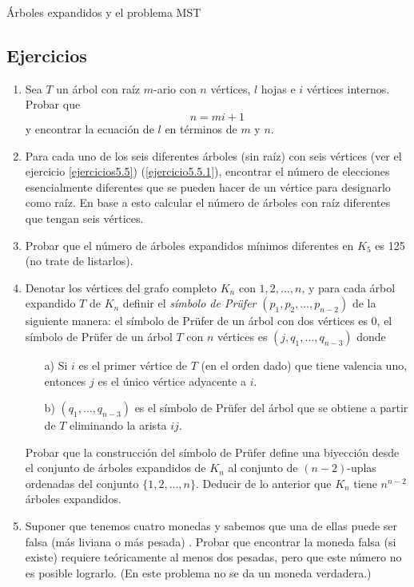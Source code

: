 \begin{section}{Árboles expandidos y el problema MST}
\section{Ejercicios}
\begin{enumerate}[1)]
\item Sea $T$ un árbol con raíz $m$-ario con $n$ vértices, $l$ hojas e
$i$ vértices internos. Probar que
$$ n=mi+1$$
y encontrar la ecuación de $l$ en términos de $m$ y $n$.

\item Para cada uno de los seis diferentes árboles (sin raíz) con seis
vértices (ver el ejercicio \ref{ejercicios5.5})
(\ref{ejercicio5.5.1}), encontrar el número de elecciones
esencialmente diferentes que se pueden hacer de un vértice para
designarlo como raíz. En base a esto calcular el número de árboles
con raíz diferentes que tengan seis vértices.

\item Probar que el número de árboles expandidos mínimos diferentes en
$K_5$ es 125 (no trate de listarlos).

\item Denotar los vértices del grafo completo $K_n$ con $1, 2,
\ldots,n$, y para cada árbol expandido $T$ de $K_n$ definir el
{\em símbolo de Prüfer} $(p_1,p_2,\ldots,p_{n-2})$ de la
 siguiente manera: el símbolo de Prüfer
de un árbol con dos vértices es $0$, el símbolo de Prüfer de un
árbol $T$ con $n$ vértices es $(j,q_1,\ldots,q_{n-3})$ donde
\begin{enumerate}
\item[a)]  Si $i$ es el primer vértice de $T$ (en el orden dado) que tiene
valencia uno, entonces $j$ es el único vértice adyacente a $i$.
\item[b)] $(q_1,\ldots,q_{n-3})$ es el símbolo de Prüfer del árbol que se
obtiene a partir de $T$ eliminando la arista $ij$.
\end{enumerate}
Probar que la construcción del símbolo de Prüfer define una
biyección desde el conjunto de árboles expandidos de $K_n$ al
conjunto de $(n-2)$-uplas ordenadas del conjunto
$\{1,2,\ldots,n\}$. Deducir de lo anterior que $K_n$ tiene
$n^{n-2}$ árboles expandidos.

 \item Suponer que tenemos cuatro monedas y sabemos que una de ellas
puede ser falsa (más liviana o más pesada) . Probar que encontrar
la moneda falsa (si existe) requiere teóricamente al menos dos
pesadas, pero que este número no es posible lograrlo. (En este
problema no se da un moneda verdadera.)
\end{enumerate}
\end{section}

